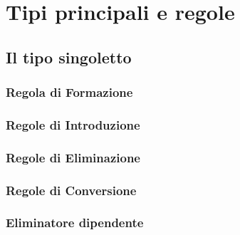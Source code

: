 \appendix
\chapter{Tipi principali e regole}

\section{Il tipo singoletto}
\subsection{Regola di Formazione}
\begin{prooftree}
\end{prooftree}

\subsection{Regole di Introduzione}
\begin{prooftree}
\end{prooftree}

\subsection{Regole di Eliminazione}
\begin{prooftree}
\end{prooftree}
\noindent
\subsection{Regole di Conversione}
\begin{prooftree}
\end{prooftree}
\subsection{Eliminatore dipendente}
\begin{prooftree}
\end{prooftree}
\newpage

